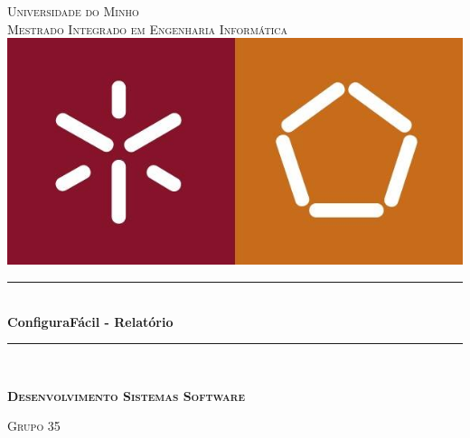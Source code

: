 \begin{titlepage}
\center %
\newcommand{\HRule}{\rule{\linewidth}{0.4mm}} %
\textsc{\LARGE Universidade do Minho}\\[0.5cm] %
\vspace{1cm}
\textsc{\large Mestrado Integrado em Engenharia Informática}\\[1.5cm] %
\includegraphics[scale=0.2]{fotoscap/um.jpg}\\[0.5cm] %
\vspace{0.5cm}

\HRule \\[1cm]
{ \Huge \bfseries ConfiguraFácil - Relatório}\\[0.7cm] %
\HRule \\[1cm]
\vspace{0.1cm}
 
\textsc{\Large \textbf{Desenvolvimento Sistemas Software}}\\[0.75cm] %
\vspace{0.1cm}

\textsc{\large{Grupo 35}}\\[0.8cm]
 


\end{titlepage}

